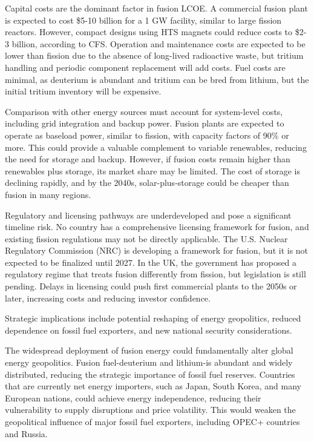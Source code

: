 \documentclass[10pt,a4paper]{article}
\begin{document}
{\small Capital costs are the dominant factor in fusion LCOE. A commercial fusion plant is expected to cost \$5-10 billion for a 1 GW facility, similar to large fission reactors. However, compact designs using HTS magnets could reduce costs to \$2-3 billion, according to CFS. Operation and maintenance costs are expected to be lower than fission due to the absence of long-lived radioactive waste, but tritium handling and periodic component replacement will add costs. Fuel costs are minimal, as deuterium is abundant and tritium can be bred from lithium, but the initial tritium inventory will be expensive.}\par
{\small Comparison with other energy sources must account for system-level costs, including grid integration and backup power. Fusion plants are expected to operate as baseload power, similar to fission, with capacity factors of 90\% or more. This could provide a valuable complement to variable renewables, reducing the need for storage and backup. However, if fusion costs remain higher than renewables plus storage, its market share may be limited. The cost of storage is declining rapidly, and by the 2040s, solar-plus-storage could be cheaper than fusion in many regions.}\par
{\small Regulatory and licensing pathways are underdeveloped and pose a significant timeline risk. No country has a comprehensive licensing framework for fusion, and existing fission regulations may not be directly applicable. The U.S. Nuclear Regulatory Commission (NRC) is developing a framework for fusion, but it is not expected to be finalized until 2027. In the UK, the government has proposed a regulatory regime that treats fusion differently from fission, but legislation is still pending. Delays in licensing could push first commercial plants to the 2050s or later, increasing costs and reducing investor confidence.}\par
{\small Strategic implications include potential reshaping of energy geopolitics, reduced dependence on fossil fuel exporters, and new national security considerations.}\par
{}\par\vspace{1pt}
{\small The widespread deployment of fusion energy could fundamentally alter global energy geopolitics. Fusion fuel-deuterium and lithium-is abundant and widely distributed, reducing the strategic importance of fossil fuel reserves. Countries that are currently net energy importers, such as Japan, South Korea, and many European nations, could achieve energy independence, reducing their vulnerability to supply disruptions and price volatility. This would weaken the geopolitical influence of major fossil fuel exporters, including OPEC+ countries and Russia.}\par
\end{document}
